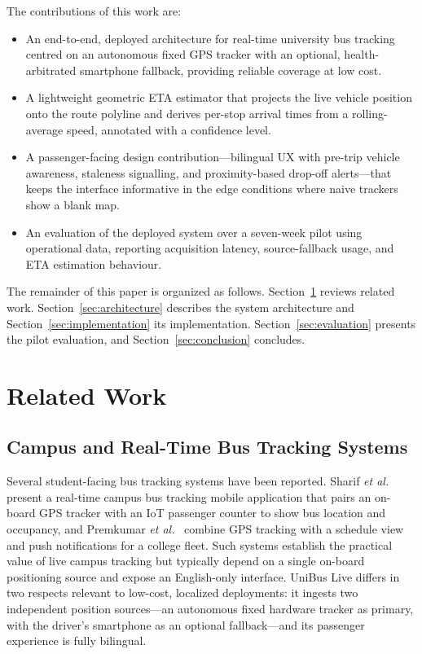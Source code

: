 \documentclass[conference]{IEEEtran}
\begin{document}
The contributions of this work are:
\begin{itemize}
  \item An end-to-end, deployed architecture for real-time university bus
  tracking centred on an autonomous fixed GPS tracker with an optional,
  health-arbitrated smartphone fallback, providing reliable coverage at
  low cost.
  \item A lightweight geometric ETA estimator that projects the live
  vehicle position onto the route polyline and derives per-stop arrival
  times from a rolling-average speed, annotated with a confidence level.
  \item A passenger-facing design contribution---bilingual UX with pre-trip
  vehicle awareness, staleness signalling, and proximity-based drop-off
  alerts---that keeps the interface informative in the edge conditions where
  naive trackers show a blank map.
  \item An evaluation of the deployed system over a seven-week pilot using
  operational data, reporting acquisition latency, source-fallback usage,
  and ETA estimation behaviour.
\end{itemize}

The remainder of this paper is organized as follows.
Section~\ref{sec:related} reviews related work.
Section~\ref{sec:architecture} describes the system architecture and
Section~\ref{sec:implementation} its implementation.
Section~\ref{sec:evaluation} presents the pilot evaluation, and
Section~\ref{sec:conclusion} concludes.

\section{Related Work}
\label{sec:related}

\subsection{Campus and Real-Time Bus Tracking Systems}
Several student-facing bus tracking systems have been reported. Sharif
\textit{et al.}~\cite{sharif2018} present a real-time campus bus tracking
mobile application that pairs an on-board GPS tracker with an IoT passenger
counter to show bus location and occupancy, and Premkumar
\textit{et al.}~\cite{premkumar2020} combine GPS tracking with a schedule view
and push notifications for a college fleet. Such systems establish the
practical value of live campus tracking but typically depend on a single
on-board positioning source and expose an English-only interface. UniBus
Live differs in two respects relevant to low-cost, localized deployments:
it ingests two independent position sources---an autonomous fixed hardware
tracker as primary, with the driver's smartphone as an optional
fallback---and its passenger experience is fully bilingual.
\end{document}
